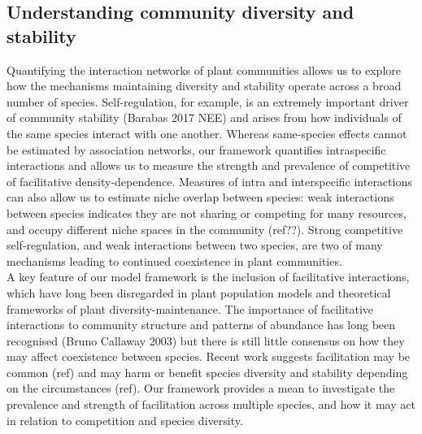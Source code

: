 \documentclass[a4,12pt]{article}
\begin{document}

    \subsection{Understanding community diversity and stability}

        Quantifying the interaction networks of plant communities allows us to explore how the mechanisms maintaining diversity and stability operate across a broad number of species. Self-regulation, for example, is an extremely important driver of community stability (Barabas 2017 NEE) and arises from how individuals of the same species interact with one another. Whereas same-species effects cannot be estimated by association networks, our framework quantifies intraspecific interactions and allows us to measure the strength and prevalence of competitive of facilitative density-dependence. Measures of intra and interspecific interactions can also allow us to estimate niche overlap between species: weak interactions between species indicates they are not sharing or competing for many resources, and occupy different niche spaces in the community (ref??). Strong competitive self-regulation, and weak interactions between two species, are two of many mechanisms leading to continued coexistence in plant communities.\\

        A key feature of our model framework is the inclusion of facilitative interactions, which have long been disregarded in plant population models and theoretical frameworks of plant diversity-maintenance. The importance of facilitative interactions to community structure and patterns of abundance has long been recognised (Bruno Callaway 2003) but there is still little consensus on how they may affect coexistence between species. Recent work suggests facilitation may be common (ref) and may harm or benefit species diversity and stability depending on the circumstances (ref). Our framework provides a mean to investigate the prevalence and strength of facilitation across multiple species, and how it may act in relation to competition and species diversity. \\
     
\end{document}
